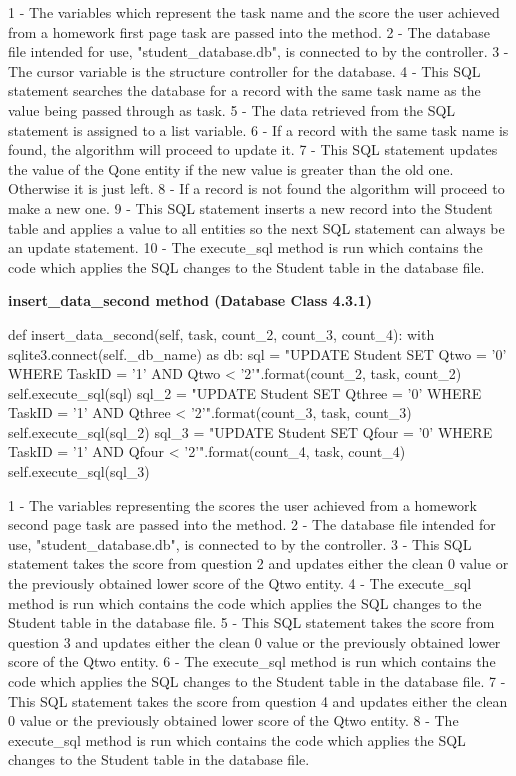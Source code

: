 1 - The variables which represent the task name and the score the user achieved from a homework first page task are passed into the method.
2 - The database file intended for use, "student\_database.db", is connected to by the controller.
3 - The cursor variable is the structure controller for the database.
4 - This SQL statement searches the database for a record with the same task name as the value being passed through as task.
5 - The data retrieved from the SQL statement is assigned to a list variable.
6 - If a record with the same task name is found, the algorithm will proceed to update it.
7 - This SQL statement updates the value of the Qone entity if the new value is greater than the old one. Otherwise it is just left.
8 - If a record is not found the algorithm will proceed to make a new one.
9 - This SQL statement inserts a new record into the Student table and applies a value to all entities so the next SQL statement can always be an update statement.
10 - The execute\_sql method is run which contains the code which applies the SQL changes to the Student table in the database file.

\textbf{insert\_data\_second method (Database Class 4.3.1)}

\begin{python}
    def insert_data_second(self, task, count_2, count_3, count_4):
        with sqlite3.connect(self._db_name) as db:
            sql = "UPDATE Student SET Qtwo = '{0}' WHERE TaskID = '{1}' AND Qtwo < '{2}'".format(count_2, task, count_2)
            self.execute_sql(sql)
            sql_2 = "UPDATE Student SET Qthree = '{0}' WHERE TaskID = '{1}' AND Qthree < '{2}'".format(count_3, task, count_3)
            self.execute_sql(sql_2)
            sql_3 = "UPDATE Student SET Qfour = '{0}' WHERE TaskID = '{1}' AND Qfour < '{2}'".format(count_4, task, count_4)
            self.execute_sql(sql_3)
\end{python}

1 - The variables representing the scores the user achieved from a homework second page task are passed into the method.
2 - The database file intended for use, "student\_database.db", is connected to by the controller.
3 - This SQL statement takes the score from question 2 and updates either the clean 0 value or the previously obtained lower score of the Qtwo entity.
4 - The execute\_sql method is run which contains the code which applies the SQL changes to the Student table in the database file.
5 - This SQL statement takes the score from question 3 and updates either the clean 0 value or the previously obtained lower score of the Qtwo entity.
6 - The execute\_sql method is run which contains the code which applies the SQL changes to the Student table in the database file.
7 - This SQL statement takes the score from question 4 and updates either the clean 0 value or the previously obtained lower score of the Qtwo entity.
8 - The execute\_sql method is run which contains the code which applies the SQL changes to the Student table in the database file.

